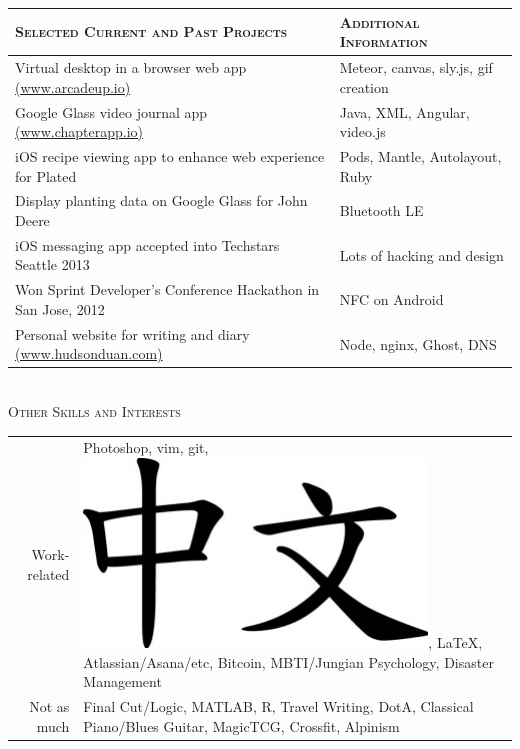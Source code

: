 \documentclass[11pt, letterpaper, UTF-8]{article}
\begin{document}
\\
\bigskip\smallskip\\
\indent\begin{tabular}{p{9cm}|p{5.4cm}}
\multicolumn{1}{l}{\textsc{Selected Current and Past Projects}} & \multicolumn{1}{l}{\textsc{Additional Information}}\\
\hline
\footnotesize{Virtual desktop in a browser web app \href{http://www.arcadeup.io}{(www.arcadeup.io)}} & \footnotesize{Meteor, canvas, sly.js, gif creation}\\
\footnotesize{Google Glass video journal app \href{http://www.chapterapp.io}{(www.chapterapp.io)}} & \footnotesize{Java, XML, Angular, video.js}\\
\footnotesize{iOS recipe viewing app to enhance web experience for Plated} & \footnotesize{Pods, Mantle, Autolayout, Ruby}\\
\footnotesize{Display planting data on Google Glass for John Deere} & \footnotesize{Bluetooth LE}\\
\footnotesize{iOS messaging app accepted into Techstars Seattle 2013} &  \footnotesize{Lots of hacking and design} \\ 
\footnotesize{Won Sprint Developer's Conference Hackathon in San Jose, 2012} & \footnotesize{NFC on Android}\\
\footnotesize{Personal website for writing and diary \href{http://www.hudsonduan.com}{(www.hudsonduan.com)}} & \footnotesize{Node, nginx, Ghost, DNS}\\
\hline
\end{tabular}
\bigskip\bigskip
\\
\indent\large{\textsc{ Other Skills and Interests}}
\begin{center}
\begin{tabular}{rp{11.5cm}}
Work-related & Photoshop, vim, git, \includegraphics[height=.38cm]{zhongwen.pdf}, \LaTeX , Atlassian/Asana/etc, Bitcoin, MBTI/Jungian Psychology,  Disaster Management\dotfill\\
Not as much & Final Cut/Logic, MATLAB, R, Travel Writing, DotA, Classical Piano/Blues Guitar, MagicTCG, Crossfit, Alpinism\dotfill\\
\end{tabular}
\end{center}
\end{document}
